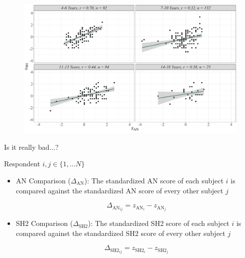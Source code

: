 \documentclass{beamer}
\begin{document}
\begin{frame}
	
	\begin{figure}
		\centering
		\includegraphics[width=\linewidth]{img/correlazioni_gruppi.pdf}
	\end{figure}
	
\end{frame}


\begin{frame}{Is it really bad...?}
	
Respondent  $i,j \in \{1, \ldots N\}$ 

 

\vspace{3mm}

\begin{itemize}
	
	\item  AN Comparison ($\Delta_{\text{AN}}$): The standardized AN score of each subject $i$ is compared against the standardized AN score of every other subject $j$

\begin{equation*}
 \Delta_{\text{AN}_{ij}} = z_{\text{AN}_i} - z_{\text{AN}_j}
\end{equation*}

	\item  SH2 Comparison ($\Delta_{\text{SH2}}$): The standardized SH2 score of each subject $i$ is compared against the standardized SH2 score of every other subject $j$

\begin{equation*}
\Delta_{\text{SH2}_{ij}} = z_{\text{SH2}_i} - z_{\text{SH2}_j}
\end{equation*}

\end{itemize}





\end{frame}
\end{document}
